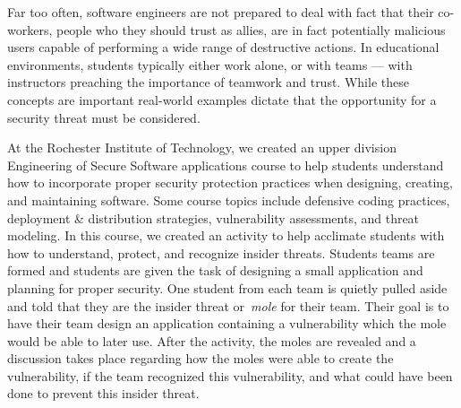 \documentclass[conference]{IEEEtran}
\newcommand{\todo}[1]{\textcolor{cyan}{\textbf{[#1]}}}
\begin{document}







Far too often, software engineers are not prepared to deal with fact that their co-workers, people who they should trust as allies, are in fact potentially malicious users capable of performing a wide range of destructive actions. In educational environments, students typically either work alone, or with teams --- with instructors preaching the importance of teamwork and trust. While these concepts are important real-world examples dictate that the opportunity for a security threat must be considered.


At the Rochester Institute of Technology, we created an upper division Engineering of Secure Software applications course to help students understand how to incorporate proper security protection practices when designing, creating, and maintaining software. Some course topics include defensive coding practices, deployment \& distribution strategies, vulnerability assessments, and threat modeling. In this course, we created an activity to help acclimate students with how to understand, protect, and recognize insider threats. Students teams are formed and students are given the task of designing a small application and planning for proper security. One student from each team is quietly pulled aside and told that they are the insider threat or~\emph{mole} for their team. Their goal is to have their team design an application containing a vulnerability which the mole would be able to later use. After the activity, the moles are revealed and a discussion takes place regarding how the moles were able to create the vulnerability, if the team recognized this vulnerability, and what could have been done to prevent this insider threat.


\end{document}
